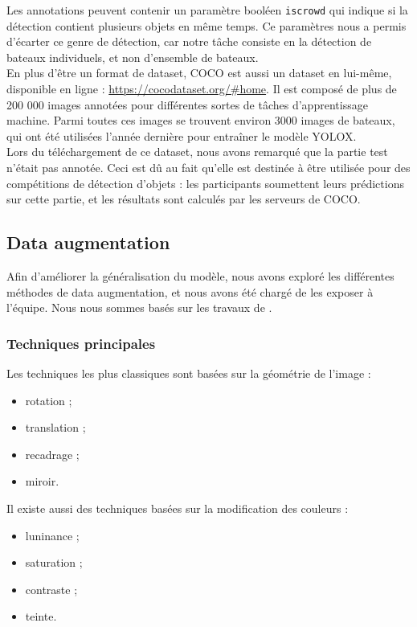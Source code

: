 Les annotations peuvent contenir un paramètre booléen \texttt{iscrowd} qui indique si 
la détection contient plusieurs objets en même temps. Ce paramètres nous a permis d'écarter
ce genre de détection, car notre tâche consiste en la détection de bateaux individuels, 
et non d'ensemble de bateaux. \\

En plus d'être un format de dataset, COCO est aussi un dataset en lui-même, disponible 
en ligne : \url{https://cocodataset.org/#home}.
Il est composé de plus de 200 000 images annotées pour différentes sortes de tâches d'apprentissage machine. 
Parmi toutes ces images se trouvent environ 3000 images de bateaux, qui ont été utilisées
l'année dernière pour entraîner le modèle YOLOX. \\

Lors du téléchargement de ce dataset, nous avons remarqué que la partie test n'était pas annotée.
Ceci est dû au fait qu'elle est destinée à être utilisée pour des compétitions de détection d'objets : 
les participants soumettent leurs prédictions sur cette partie, et les résultats sont calculés par les 
serveurs de COCO.\\

\subsection{Data augmentation}

Afin d'améliorer la généralisation du modèle, nous avons exploré les différentes méthodes de data augmentation, 
et nous avons été chargé de les exposer à l'équipe. Nous nous sommes basés 
sur les travaux de \cite{Mumuni_Mumuni_2022}.

\subsubsection{Techniques principales}

Les techniques les plus classiques sont basées sur la géométrie de l'image : 
\begin{itemize}
    \item rotation ;
    \item translation ;
    \item recadrage ; 
    \item miroir.
\end{itemize}

Il existe aussi des techniques basées sur la modification des couleurs : 
\begin{itemize}
    \item luninance ;
    \item saturation ;
    \item contraste ; 
    \item teinte.
\end{itemize}


